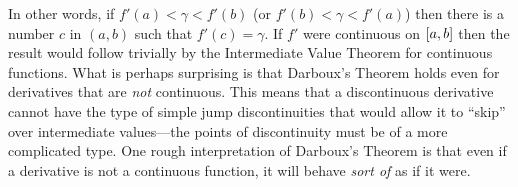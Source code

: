 
In other words, if $f'(a) < \gamma < f'(b)$ (or $f'(b) < \gamma < f'(a)$) then
there is a number $c$ in $(a,b)$ such that $f'(c) = \gamma$. If $f'$ were
continuous on $\lbrack a,b \rbrack$ then the result would follow trivially by the
Intermediate Value Theorem for continuous functions. What is perhaps surprising
is that Darboux's Theorem holds even for derivatives that are \emph{not}
continuous. This means that a discontinuous derivative cannot have the type of
simple jump discontinuities that would allow it to ``skip'' over intermediate
values---the points of discontinuity must be of a more complicated type. One
rough interpretation of Darboux's Theorem is that even if a derivative is not a
continuous function, it will behave \emph{sort of} as if it were.\vspace{3mm}

